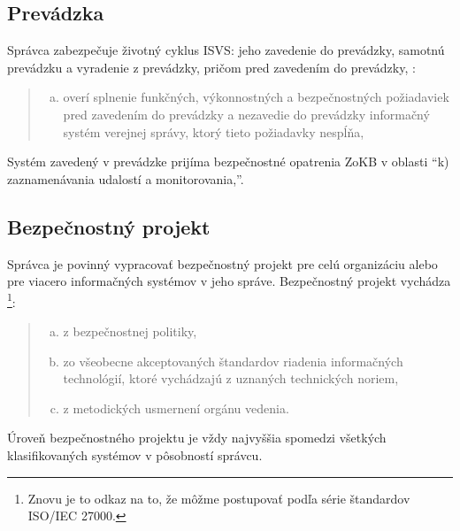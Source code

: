 \subsection{Prevádzka}
Správca zabezpečuje životný cyklus \acrshort{ISVS}: jeho zavedenie do prevádzky, samotnú prevádzku a vyradenie z prevádzky,
pričom pred zavedením do prevádzky, \cite[\S 21 ods. (2)]{95/2019}:

\begin{quote}
  \begin{enumerate}[a)]
    \item overí splnenie funkčných, výkonnostných a bezpečnostných požiadaviek pred zavedením do prevádzky a nezavedie do prevádzky
      informačný systém verejnej správy, ktorý tieto požiadavky nespĺňa,
  \end{enumerate}
\end{quote}
Systém zavedený v prevádzke\cite[\S 22]{95/2019} prijíma bezpečnostné opatrenia ZoKB v oblasti \enquote{k)
zaznamenávania udalostí a monitorovania,}.

\subsection{Bezpečnostný projekt}

Správca je povinný vypracovať bezpečnostný projekt pre celú organizáciu alebo pre viacero informačných systémov v jeho správe.
Bezpečnostný projekt vychádza \cite[\S 23 ods. (1)]{95/2019}\footnote{Znovu je to odkaz na to, že môžme postupovať podľa série
štandardov ISO/IEC 27000.}:
\begin{quote}
  \begin{enumerate}[a)]
    \item z bezpečnostnej politiky,
    \item zo všeobecne akceptovaných štandardov riadenia informačných technológií, ktoré vychádzajú z uznaných technických noriem,
    \item z metodických usmernení orgánu vedenia.
  \end{enumerate}
\end{quote}
Úroveň bezpečnostného projektu je vždy najvyššia spomedzi všetkých klasifikovaných systémov v pôsobností správcu.



